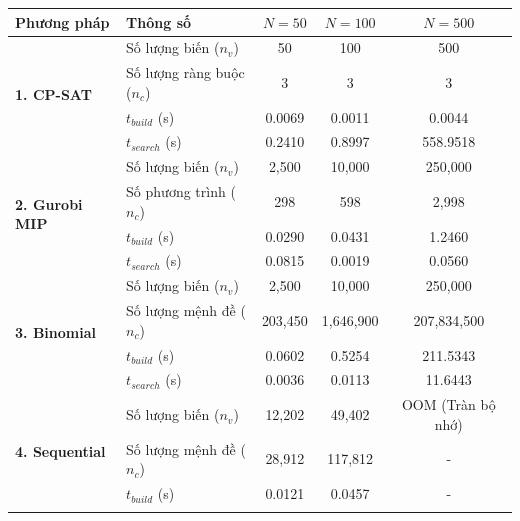 \documentclass[a4paper,fleqn,numbers]{cas-sc}
\begin{document}
\begin{table}[H]
{            \begin{tabular}{|l|l|c|c|c|}
                \hline
                \textbf{Phương pháp} & \textbf{Thông số} & \textbf{$N=50$} & \textbf{$N=100$} &
                \textbf{$N=500$} \\
                \hline
                \multirow{4}{*}{\textbf{1. CP-SAT}}
                & Số lượng biến ($n_v$)      & 50       & 100       & 500               \\ \cline{2-5}
                & Số lượng ràng buộc ($n_c$) & 3        & 3         & 3                 \\ \cline{2-5}
                & $t_{build}$ (s)            & 0.0069   & 0.0011    & 0.0044            \\ \cline{2-5}
                & $t_{search}$ (s)           & 0.2410   & 0.8997    & 558.9518          \\
                \hline
                \multirow{4}{*}{\textbf{2. Gurobi MIP}}
                & Số lượng biến ($n_v$)      & 2,500    & 10,000    & 250,000           \\ \cline{2-5}
                & Số phương trình ($n_c$)    & 298      & 598       & 2,998             \\ \cline{2-5}
                & $t_{build}$ (s)            & 0.0290   & 0.0431    & 1.2460            \\ \cline{2-5}
                & $t_{search}$ (s)           & 0.0815   & 0.0019    & 0.0560            \\
                \hline
                \multirow{4}{*}{\textbf{3. Binomial}}
                & Số lượng biến ($n_v$)      & 2,500    & 10,000    & 250,000           \\ \cline{2-5}
                & Số lượng mệnh đề ($n_c$)   & 203,450  & 1,646,900 & 207,834,500       \\ \cline{2-5}
                & $t_{build}$ (s)            & 0.0602   & 0.5254    & 211.5343          \\ \cline{2-5}
                & $t_{search}$ (s)           & 0.0036   & 0.0113    & 11.6443           \\
                \hline
                \multirow{4}{*}{\textbf{4. Sequential}}
                & Số lượng biến ($n_v$)      & 12,202   & 49,402    & OOM (Tràn bộ nhớ) \\ \cline{2-5}
                & Số lượng mệnh đề ($n_c$)   & 28,912   & 117,812   & -                 \\ \cline{2-5}
                & $t_{build}$ (s)            & 0.0121   & 0.0457    & -                 \\ \cline{2-5}

\end{tabular}}
\end{table}
\end{document}

